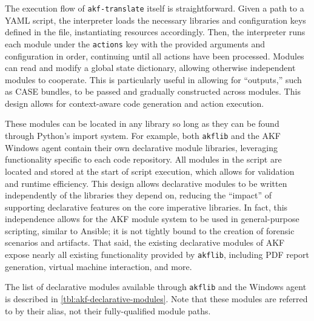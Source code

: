\documentclass[preprint,12pt]{elsarticle}
\newcommand{\passthrough}[1]{#1}
\begin{document}
The execution flow of \passthrough{\lstinline!akf-translate!} itself is
straightforward. Given a path to a YAML script, the interpreter loads
the necessary libraries and configuration keys defined in the file,
instantiating resources accordingly. Then, the interpreter runs each
module under the \passthrough{\lstinline!actions!} key with the provided
arguments and configuration in order, continuing until all actions have
been processed. Modules can read and modify a global state dictionary,
allowing otherwise independent modules to cooperate. This is
particularly useful in allowing for ``outputs,'' such as CASE bundles,
to be passed and gradually constructed across modules. This design
allows for context-aware code generation and action execution.

These modules can be located in any library so long as they can be found
through Python's import system. For example, both
\passthrough{\lstinline!akflib!} and the AKF Windows agent contain their
own declarative module libraries, leveraging functionality specific to
each code repository. All modules in the script are located and stored
at the start of script execution, which allows for validation and
runtime efficiency. This design allows declarative modules to be written
independently of the libraries they depend on, reducing the ``impact''
of supporting declarative features on the core imperative libraries. In
fact, this independence allows for the AKF module system to be used in
general-purpose scripting, similar to Ansible; it is not tightly bound
to the creation of forensic scenarios and artifacts. That said, the
existing declarative modules of AKF expose nearly all existing
functionality provided by \passthrough{\lstinline!akflib!}, including
PDF report generation, virtual machine interaction, and more.

The list of declarative modules available through
\passthrough{\lstinline!akflib!} and the Windows agent is described in
\autoref{tbl:akf-declarative-modules}. Note that these modules are
referred to by their alias, not their fully-qualified module paths.
\end{document}
